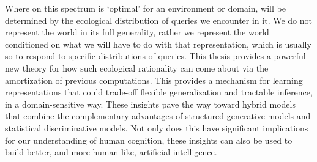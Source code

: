 Where on this spectrum is `optimal' for an environment or domain, will be determined by the ecological distribution of queries we encounter in it. We do not represent the world in its full generality, rather we represent the world conditioned on what we will have to do with that representation, which is usually so to respond to specific distributions of queries. This thesis provides a powerful new theory for how such ecological rationality can come about via the amortization of previous computations. This provides a mechanism for learning representations that could trade-off flexible generalization and tractable inference, in a domain-sensitive way. These insights pave the way toward hybrid models that combine the complementary advantages of structured generative models and statistical discriminative models. Not only does this have significant implications for our understanding of human cognition, these insights can also be used to build better, and more human-like, artificial intelligence.







